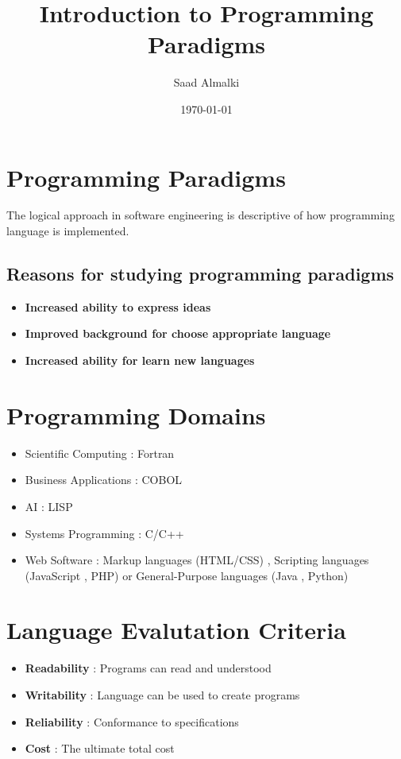 \documentclass[12pt]{article}
\title{Introduction to Programming Paradigms}
\author{Saad Almalki}
\date{\today}
\begin{document}
\maketitle

\section{Programming Paradigms} 
The logical approach in software engineering is descriptive of how programming language is implemented.

\subsection{Reasons for studying programming paradigms}
\begin{itemize}
    \item \textbf{Increased ability to express ideas}
    \item \textbf{Improved background for choose appropriate language}
    \item \textbf{Increased ability for learn new languages}
\end{itemize}

\section{Programming Domains} 
\begin{itemize}
    \item Scientific Computing :  Fortran
    \item Business Applications : COBOL
    \item AI : LISP
    \item Systems Programming : C/C++
    \item Web Software : Markup languages (HTML/CSS) , Scripting languages (JavaScript , PHP) or General-Purpose languages (Java , Python)
\end{itemize}


\section{Language Evalutation Criteria}

\begin{itemize}
    \item \textbf{Readability} : Programs can read and understood
    \item \textbf{Writability} : Language can be used to create programs
    \item \textbf{Reliability} : Conformance to specifications
    \item \textbf{Cost} : The ultimate total cost
\end{itemize}
\end{document}
